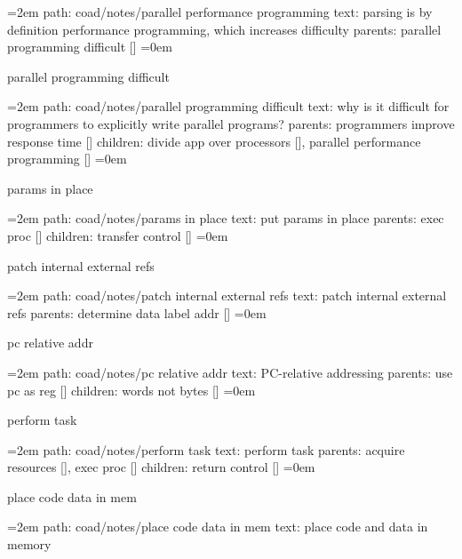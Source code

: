 \smallskip
\par\begingroup
\leftskip=2em
path: coad/notes/parallel performance programming
\smallskip
text:  parsing is by definition performance programming, which increases difficulty
\smallskip
parents:  parallel programming difficult []
\smallskip
\leftskip=0em
\par\endgroup
\bigskip
{}
parallel programming difficult
\smallskip
\par\begingroup
\leftskip=2em
path: coad/notes/parallel programming difficult
\smallskip
text:  why is it difficult for programmers to explicitly write parallel programs?
\smallskip
parents:  programmers improve response time []
\smallskip
children: divide app over processors [], parallel performance programming []
\smallskip
\leftskip=0em
\par\endgroup
\bigskip
{}
params in place
\smallskip
\par\begingroup
\leftskip=2em
path: coad/notes/params in place
\smallskip
text:  put params in place
\smallskip
parents:  exec proc []
\smallskip
children: transfer control []
\smallskip
\leftskip=0em
\par\endgroup
\bigskip
{}
patch internal external refs
\smallskip
\par\begingroup
\leftskip=2em
path: coad/notes/patch internal external refs
\smallskip
text:  patch internal external refs
\smallskip
parents:  determine data label addr []
\smallskip
\leftskip=0em
\par\endgroup
\bigskip
{}
pc relative addr
\smallskip
\par\begingroup
\leftskip=2em
path: coad/notes/pc relative addr
\smallskip
text:  PC-relative addressing
\smallskip
parents:  use pc as reg []
\smallskip
children: words not bytes []
\smallskip
\leftskip=0em
\par\endgroup
\bigskip
{}
perform task
\smallskip
\par\begingroup
\leftskip=2em
path: coad/notes/perform task
\smallskip
text:  perform task
\smallskip
parents:  acquire resources [], exec proc []
\smallskip
children: return control []
\smallskip
\leftskip=0em
\par\endgroup
\bigskip
{}
place code data in mem
\smallskip
\par\begingroup
\leftskip=2em
path: coad/notes/place code data in mem
\smallskip
text:  place code and data in memory
